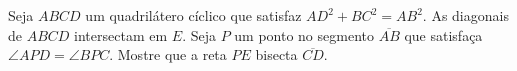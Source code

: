 Seja $ABCD$ um quadrilátero cíclico que satisfaz $AD^2+BC^2=AB^2$. As diagonais de $ABCD$ intersectam em $E$. Seja $P$ um ponto no segmento $\overline{AB}$ que satisfaça $\angle{APD}=\angle{BPC}$. Mostre que a reta $PE$ bisecta $\overline{CD}$.
